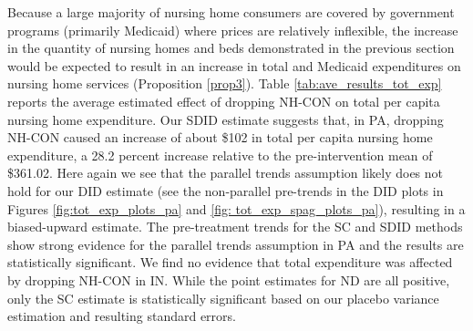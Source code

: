 \documentclass[../Main.tex]{subfiles}
\begin{document}
Because a large majority of nursing home consumers are covered by government programs (primarily Medicaid) where prices are relatively inflexible, the increase in the quantity of nursing homes and beds demonstrated in the previous section would be expected to result in an increase in total and Medicaid expenditures on nursing home services (Proposition \ref{prop3}). Table \ref{tab:ave_results_tot_exp} reports the average estimated effect of dropping NH-CON on total per capita nursing home expenditure. Our SDID estimate suggests that, in PA, dropping NH-CON caused an increase of about \$102 in total per capita nursing home expenditure, a 28.2 percent increase relative to the pre-intervention mean of \$361.02. Here again we see that the parallel trends assumption likely does not hold for our DID estimate (see the non-parallel pre-trends in the DID plots in Figures \ref{fig:tot_exp_plots_pa} and \ref{fig: tot_exp_spag_plots_pa}), resulting in a biased-upward estimate. The pre-treatment trends for the SC and SDID methods show strong evidence for the parallel trends assumption in PA and the results are statistically significant. We find no evidence that total expenditure was affected by dropping NH-CON in IN. While the point estimates for ND are all positive, only the SC estimate is statistically significant based on our placebo variance estimation and resulting standard errors.\\
\end{document}
